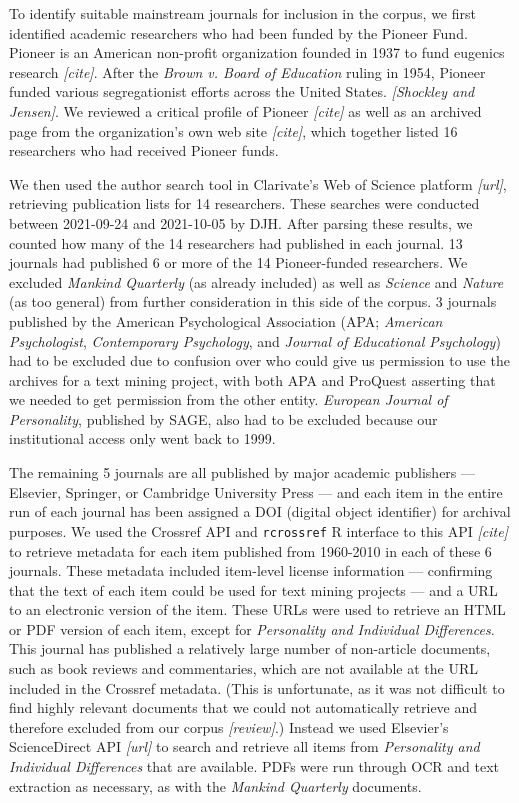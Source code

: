 \documentclass[12pt]{article}
\begin{document}
To identify suitable mainstream journals for inclusion in the corpus, we first identified academic researchers who had been funded by the Pioneer Fund. Pioneer is an American non-profit organization founded in 1937 to fund eugenics research \emph{{[}cite{]}}. After the \emph{Brown v. Board of Education} ruling in 1954, Pioneer funded various segregationist efforts across the United States. \emph{{[}Shockley and Jensen{]}}. We reviewed a critical profile of Pioneer \emph{{[}cite{]}} as well as an archived page from the organization's own web site \emph{{[}cite{]}}, which together listed 16 researchers who had received Pioneer funds.

We then used the author search tool in Clarivate's Web of Science platform \emph{{[}url{]}}, retrieving publication lists for 14 researchers. These searches were conducted between 2021-09-24 and 2021-10-05 by DJH. After parsing these results, we counted how many of the 14 researchers had published in each journal. 13 journals had published 6 or more of the 14 Pioneer-funded researchers. We excluded \emph{Mankind Quarterly} (as already included) as well as \emph{Science} and \emph{Nature} (as too general) from further consideration in this side of the corpus. 3 journals published by the American Psychological Association (APA; \emph{American Psychologist}, \emph{Contemporary Psychology}, and \emph{Journal of Educational Psychology}) had to be excluded due to confusion over who could give us permission to use the archives for a text mining project, with both APA and ProQuest asserting that we needed to get permission from the other entity. \emph{European Journal of Personality}, published by SAGE, also had to be excluded because our institutional access only went back to 1999.

The remaining 5 journals are all published by major academic publishers --- Elsevier, Springer, or Cambridge University Press --- and each item in the entire run of each journal has been assigned a DOI (digital object identifier) for archival purposes. We used the Crossref API and \texttt{rcrossref} R interface to this API \emph{{[}cite{]}} to retrieve metadata for each item published from 1960-2010 in each of these 6 journals. These metadata included item-level license information --- confirming that the text of each item could be used for text mining projects --- and a URL to an electronic version of the item. These URLs were used to retrieve an HTML or PDF version of each item, except for \emph{Personality and Individual Differences}. This journal has published a relatively large number of non-article documents, such as book reviews and commentaries, which are not available at the URL included in the Crossref metadata. (This is unfortunate, as it was not difficult to find highly relevant documents that we could not automatically retrieve and therefore excluded from our corpus \emph{{[}review{]}}.) Instead we used Elsevier's ScienceDirect API \emph{{[}url{]}} to search and retrieve all items from \emph{Personality and Individual Differences} that are available. PDFs were run through OCR and text extraction as necessary, as with the \emph{Mankind Quarterly} documents.
\end{document}
